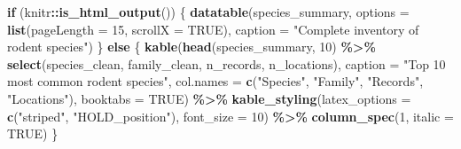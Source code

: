 \documentclass[
]{article}
\newenvironment{Shaded}{\begin{snugshade}}{\end{snugshade}}
\newcommand{\AttributeTok}[1]{\textcolor[rgb]{0.13,0.29,0.53}{#1}}
\newcommand{\ConstantTok}[1]{\textcolor[rgb]{0.56,0.35,0.01}{#1}}
\newcommand{\ControlFlowTok}[1]{\textcolor[rgb]{0.13,0.29,0.53}{\textbf{#1}}}
\newcommand{\DecValTok}[1]{\textcolor[rgb]{0.00,0.00,0.81}{#1}}
\newcommand{\FunctionTok}[1]{\textcolor[rgb]{0.13,0.29,0.53}{\textbf{#1}}}
\newcommand{\NormalTok}[1]{#1}
\newcommand{\SpecialCharTok}[1]{\textcolor[rgb]{0.81,0.36,0.00}{\textbf{#1}}}
\newcommand{\StringTok}[1]{\textcolor[rgb]{0.31,0.60,0.02}{#1}}
\begin{document}
\begin{Shaded}
\begin{Highlighting}[]
\ControlFlowTok{if}\NormalTok{ (knitr}\SpecialCharTok{::}\FunctionTok{is\_html\_output}\NormalTok{()) \{}
  \FunctionTok{datatable}\NormalTok{(species\_summary,}
            \AttributeTok{options =} \FunctionTok{list}\NormalTok{(}\AttributeTok{pageLength =} \DecValTok{15}\NormalTok{, }\AttributeTok{scrollX =} \ConstantTok{TRUE}\NormalTok{),}
            \AttributeTok{caption =} \StringTok{"Complete inventory of rodent species"}\NormalTok{)}
\NormalTok{\} }\ControlFlowTok{else}\NormalTok{ \{}
  \FunctionTok{kable}\NormalTok{(}\FunctionTok{head}\NormalTok{(species\_summary, }\DecValTok{10}\NormalTok{) }\SpecialCharTok{\%\textgreater{}\%} 
          \FunctionTok{select}\NormalTok{(species\_clean, family\_clean, n\_records, n\_locations),}
        \AttributeTok{caption =} \StringTok{"Top 10 most common rodent species"}\NormalTok{,}
        \AttributeTok{col.names =} \FunctionTok{c}\NormalTok{(}\StringTok{"Species"}\NormalTok{, }\StringTok{"Family"}\NormalTok{, }\StringTok{"Records"}\NormalTok{, }\StringTok{"Locations"}\NormalTok{),}
        \AttributeTok{booktabs =} \ConstantTok{TRUE}\NormalTok{) }\SpecialCharTok{\%\textgreater{}\%}
    \FunctionTok{kable\_styling}\NormalTok{(}\AttributeTok{latex\_options =} \FunctionTok{c}\NormalTok{(}\StringTok{"striped"}\NormalTok{, }\StringTok{"HOLD\_position"}\NormalTok{),}
                  \AttributeTok{font\_size =} \DecValTok{10}\NormalTok{) }\SpecialCharTok{\%\textgreater{}\%}
    \FunctionTok{column\_spec}\NormalTok{(}\DecValTok{1}\NormalTok{, }\AttributeTok{italic =} \ConstantTok{TRUE}\NormalTok{)}
\NormalTok{\}}
\end{Highlighting}
\end{Shaded}

\begingroup\fontsize{10}{12}\selectfont
\end{document}
